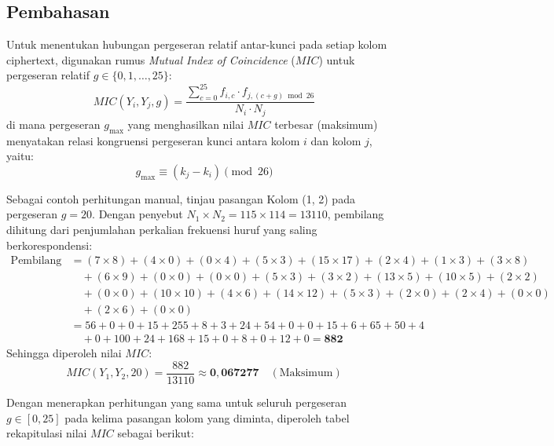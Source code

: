 \documentclass[11pt,a4paper]{article}
\begin{document}
\subsection*{Pembahasan}

Untuk menentukan hubungan pergeseran relatif antar-kunci pada setiap kolom ciphertext, digunakan rumus \textit{Mutual Index of Coincidence} ($MIC$) untuk pergeseran relatif $g \in \{0, 1, \dots, 25\}$:
$$MIC(Y_i, Y_j, g) = \frac{\sum_{c=0}^{25} f_{i, c} \cdot f_{j, (c + g) \bmod 26}}{N_i \cdot N_j}$$
di mana pergeseran $g_{\text{max}}$ yang menghasilkan nilai $MIC$ terbesar (maksimum) menyatakan relasi kongruensi pergeseran kunci antara kolom $i$ dan kolom $j$, yaitu:
$$g_{\text{max}} \equiv (k_j - k_i) \pmod{26}$$

Sebagai contoh perhitungan manual, tinjau pasangan Kolom (1, 2) pada pergeseran $g = 20$. Dengan penyebut $N_1 \times N_2 = 115 \times 114 = 13110$, pembilang dihitung dari penjumlahan perkalian frekuensi huruf yang saling berkorespondensi:
\begin{align*}
\text{Pembilang} &= (7 \times 8) + (4 \times 0) + (0 \times 4) + (5 \times 3) + (15 \times 17) + (2 \times 4) + (1 \times 3) + (3 \times 8) \\
&\quad + (6 \times 9) + (0 \times 0) + (0 \times 0) + (5 \times 3) + (3 \times 2) + (13 \times 5) + (10 \times 5) + (2 \times 2) \\
&\quad + (0 \times 0) + (10 \times 10) + (4 \times 6) + (14 \times 12) + (5 \times 3) + (2 \times 0) + (2 \times 4) + (0 \times 0) \\
&\quad + (2 \times 6) + (0 \times 0) \\
&= 56 + 0 + 0 + 15 + 255 + 8 + 3 + 24 + 54 + 0 + 0 + 15 + 6 + 65 + 50 + 4 \\
&\quad + 0 + 100 + 24 + 168 + 15 + 0 + 8 + 0 + 12 + 0 = \mathbf{882}
\end{align*}
Sehingga diperoleh nilai $MIC$:
$$MIC(Y_1, Y_2, 20) = \frac{882}{13110} \approx \mathbf{0{,}067277} \quad (\text{Maksimum})$$

Dengan menerapkan perhitungan yang sama untuk seluruh pergeseran $g \in [0, 25]$ pada kelima pasangan kolom yang diminta, diperoleh tabel rekapitulasi nilai $MIC$ sebagai berikut:
\end{document}
